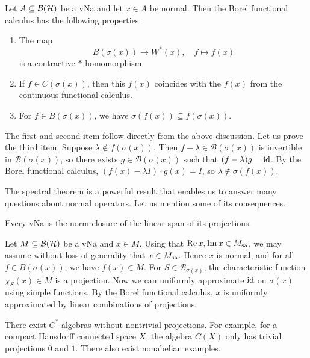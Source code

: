 \begin{theorem}
  Let $A \subseteq \operatorname{\mathcal{B} (\mathcal{H})}$ be a vNa and let $x \in A$ be normal.
  Then the Borel functional calculus has the following properties:
  \begin{enumerate}
    \item The map $$B (\sigma(x)) \to W^*(x),\quad f \mapsto f(x)$$
    is a contractive $*$-homomorphism.
    \item If $f \in C(\sigma(x))$, then this $f(x)$ coincides with the $f(x)$ from the continuous functional calculus.
    \item For $f \in B (\sigma(x))$, we have $\sigma(f(x)) \subseteq f(\sigma(x))$.
  \end{enumerate}
\end{theorem}

\begin{myproof}
  The first and second item follow directly from the above discussion. 
  Let us prove the third item.
  Suppose $\lambda \notin f(\sigma (x))$. Then $f - \lambda \in \mathcal{B} (\sigma(x))$
    is invertible in $\mathcal{B}(\sigma(x))$, so there exists $g \in \mathcal{B} (\sigma(x))$ such that $(f - \lambda) g = \operatorname{id}$.
    By the Borel functional calculus, $(f(x) - \lambda I) \cdot g(x) = I$, so $\lambda \notin \sigma(f(x))$. 
\end{myproof}

The spectral theorem is a powerful result that enables us to answer many questions about normal operators.
Let us mention some of its consequences.

\begin{corollary}
  Every vNa is the norm-closure of the linear span of its projections.
\end{corollary}

\begin{myproof}
  Let $M \subseteq \operatorname{\mathcal{B} (\mathcal{H})}$ be a vNa and $x \in M$. Using that $\operatorname{Re} x, \operatorname{Im} x \in M_{\operatorname{sa}}$,
  we may assume without loss of generality that $x \in M_{\operatorname{sa}}$. Hence $x$ is normal, and for all $f \in B(\sigma(x))$, we have $f(x) \in M$.
  For $S \in \mathcal{B}_{\sigma(x)}$, the characteristic function $\chi_S (x) \in M$ is a projection. 
  Now we can uniformly approximate $\operatorname{id}$ on $\sigma(x)$ using simple functions. By the Borel functional calculus, 
  $x$ is uniformly approximated by linear combinations of projections.
\end{myproof}

\begin{remark}
  There exist $C^*$-algebras without nontrivial projections.
  For example, for a compact Hausdorff connected space $X$, the algebra $C(X)$ only has trivial projections $0$ and $1$.
  There also exist nonabelian examples.            
\end{remark}

